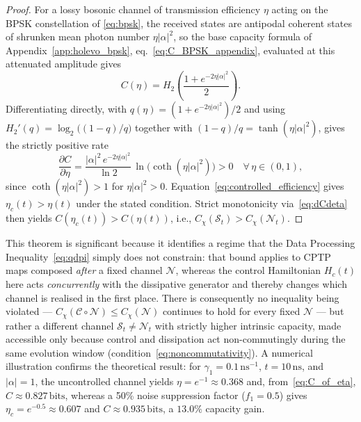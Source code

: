 \documentclass[journal,twocolumn]{IEEEtran}
\theoremstyle{definition}
\theoremstyle{plain}
\begin{document}
\begin{proof}
For a lossy bosonic channel of transmission efficiency $\eta$
acting on the BPSK constellation of \eqref{eq:bpsk}, the received
states are antipodal coherent states of shrunken mean photon number
$\eta|\alpha|^2$, so the base capacity formula of
Appendix~\ref{app:holevo_bpsk}, eq.~\eqref{eq:C_BPSK_appendix},
evaluated at this attenuated amplitude gives
\begin{equation}
  C(\eta) = H_2\!\left(\frac{1+e^{-2\eta|\alpha|^2}}{2}\right).
  \label{eq:C_of_eta}
\end{equation}
Differentiating directly, with $q(\eta) = (1+e^{-2\eta|\alpha|^2})/2$
and using $H_2'(q) = \log_2\bigl((1-q)/q\bigr)$ together with
$(1-q)/q = \tanh(\eta|\alpha|^2)$, gives the strictly positive rate
\begin{equation}
  \frac{\partial C}{\partial\eta} =
  \frac{|\alpha|^2\, e^{-2\eta|\alpha|^2}}{\ln 2}\,
  \ln\!\bigl(\coth(\eta|\alpha|^2)\bigr) > 0
  \quad \forall\, \eta \in (0,1),
  \label{eq:dCdeta}
\end{equation}
since $\coth(\eta|\alpha|^2) > 1$ for $\eta|\alpha|^2>0$.
Equation~\eqref{eq:controlled_efficiency} gives $\eta_c(t) > \eta(t)$
under the stated condition.  Strict monotonicity
via~\eqref{eq:dCdeta} then yields
$C(\eta_c(t)) > C(\eta(t))$, i.e., $C_\chi(\mathcal{S}_t) >
C_\chi(\mathcal{N}_t)$.
\end{proof}

This theorem is significant because it identifies a regime that the
Data Processing Inequality~\eqref{eq:qdpi} simply does not
constrain: that bound applies to CPTP maps composed \emph{after} a
fixed channel $\mathcal N$, whereas the control Hamiltonian $H_c(t)$
here acts \emph{concurrently} with the dissipative generator and
thereby changes which channel is realised in the first place. There
is consequently no inequality being violated --- $C_\chi(\mathcal
C\circ\mathcal N)\le C_\chi(\mathcal N)$ continues to hold for every
fixed $\mathcal N$ --- but rather a different channel $\mathcal S_t
\ne \mathcal N_t$ with strictly higher intrinsic capacity, made
accessible only because control and dissipation act non-commutingly
during the same evolution window (condition~\eqref{eq:noncommutativity}).
A numerical illustration confirms the theoretical
result: for $\gamma_1 = 0.1\,\mathrm{ns}^{-1}$, $t =
10\,\mathrm{ns}$, and $|\alpha|=1$, the uncontrolled channel yields
$\eta = e^{-1} \approx 0.368$ and, from~\eqref{eq:C_of_eta},
$C \approx 0.827\,\mathrm{bits}$, whereas a 50\% noise suppression
factor ($f_1 = 0.5$) gives $\eta_c = e^{-0.5} \approx 0.607$ and
$C \approx 0.935\,\mathrm{bits}$, a $13.0\%$ capacity gain.
\end{document}
